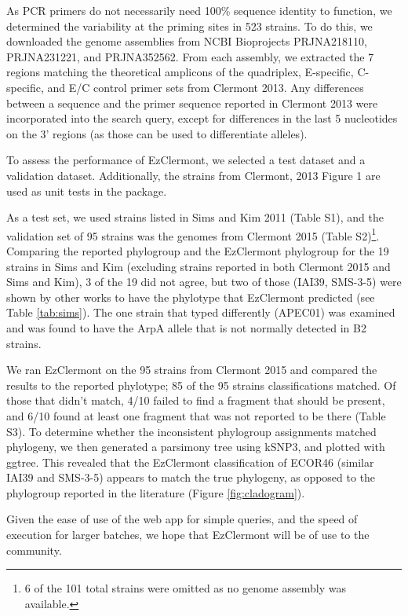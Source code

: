 As PCR primers do not necessarily need 100\% sequence identity to function, we determined the variability at the priming sites in 523 strains. To do this, we downloaded the genome assemblies from NCBI Bioprojects PRJNA218110, PRJNA231221, and PRJNA352562.  From each assembly, we extracted the 7 regions matching the theoretical amplicons of the quadriplex, E-specific, C-specific, and E/C control primer sets from Clermont 2013.  Any differences between a sequence and the primer sequence reported in Clermont 2013 were incorporated into the search query, except for differences in the last 5 nucleotides on the 3’ regions (as those can be used to differentiate alleles)\cite{Stadhouders2010}.

To assess the performance of EzClermont, we selected a test dataset and a validation dataset.  Additionally, the strains from Clermont, 2013 Figure 1 are used as unit tests in the package.

As a test set, we used strains listed in Sims and Kim 2011\cite{Sims2011} (Table S1), and the validation set of 95 strains was the genomes from Clermont 2015\cite{Denamur2015} (Table S2)\footnote{6 of the 101 total strains were omitted as no genome assembly was available.}.  Comparing the reported phylogroup and the EzClermont phylogroup for the 19 strains in Sims and Kim (excluding strains reported in both Clermont 2015 and Sims and Kim),  3 of the 19 did not agree, but two of those (IAI39, SMS-3-5) were shown by other works to have the phylotype that EzClermont predicted (see Table \ref{tab:sims}).  The one strain that typed differently (APEC01) was examined and was found to have the ArpA allele that is not normally detected in B2 strains.





We ran EzClermont on the 95 strains from Clermont 2015 and compared the results to the reported phylotype; 85 of the 95 strains classifications matched.  Of those that didn’t match, 4/10 failed to find a fragment that should be present, and 6/10 found at least one fragment that was not reported to be there (Table S3). To determine whether the inconsistent phylogroup assignments matched phylogeny, we then generated a parsimony tree using kSNP3, and plotted with ggtree\cite{Yu2017a}. This revealed that the EzClermont classification of ECOR46 (similar IAI39 and SMS-3-5) appears to match the true phylogeny, as opposed to the phylogroup reported in the literature (Figure \ref{fig:cladogram}).





Given the ease of use of the web app for simple queries, and the speed of execution for larger batches, we hope that EzClermont will be of use to the community.
